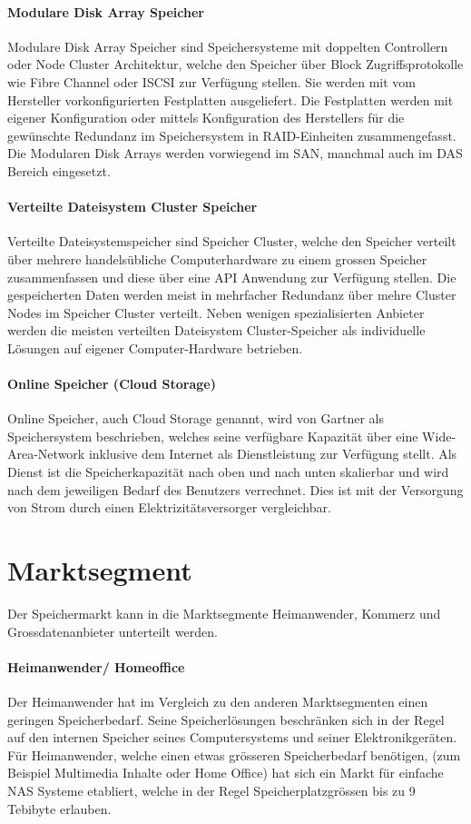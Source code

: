 \paragraph*{Modulare Disk Array Speicher}
Modulare Disk Array Speicher sind Speichersysteme mit doppelten Controllern oder Node Cluster Architektur, welche den Speicher über Block Zugriffsprotokolle wie Fibre Channel oder ISCSI zur Verfügung stellen. Sie werden mit vom Hersteller vorkonfigurierten Festplatten ausgeliefert. Die Festplatten werden mit eigener Konfiguration oder mittels Konfiguration des Herstellers für die gewünschte Redundanz im Speichersystem in RAID-Einheiten zusammengefasst. Die Modularen Disk Arrays werden vorwiegend im SAN, manchmal auch im DAS Bereich eingesetzt.

\paragraph*{Verteilte Dateisystem Cluster Speicher}
Verteilte Dateisystemspeicher sind Speicher Cluster, welche den Speicher verteilt über mehrere handelsübliche Computerhardware zu einem grossen Speicher zusammenfassen und diese über eine API Anwendung zur Verfügung stellen. Die gespeicherten Daten werden meist in mehrfacher Redundanz über mehre Cluster Nodes im Speicher Cluster verteilt. Neben wenigen spezialisierten Anbieter werden die meisten verteilten Dateisystem Cluster-Speicher als individuelle Lösungen auf eigener Computer-Hardware betrieben.

\paragraph*{Online Speicher (Cloud Storage)}
Online Speicher, auch Cloud Storage genannt, wird von Gartner als Speichersystem beschrieben, welches seine verfügbare Kapazität über eine Wide-Area-Network inklusive dem Internet als Dienstleistung zur Verfügung stellt. Als Dienst ist die Speicherkapazität nach oben und nach unten skalierbar und wird nach dem jeweiligen Bedarf des Benutzers verrechnet. Dies ist mit der Versorgung von Strom durch einen Elektrizitätsversorger vergleichbar. \cite{AdamW.Couture2010}

\section{Marktsegment}
Der Speichermarkt kann in die Marktsegmente Heimanwender, Kommerz und Grossdatenanbieter unterteilt werden.

\paragraph*{Heimanwender/ Homeoffice} 
Der Heimanwender hat im Vergleich zu den anderen Marktsegmenten einen geringen Speicherbedarf. Seine Speicherlösungen beschränken sich in der Regel auf den internen Speicher seines Computersystems und seiner Elektronikgeräten. Für Heimanwender, welche einen etwas grösseren Speicherbedarf benötigen, (zum Beispiel Multimedia Inhalte oder Home Office) hat sich ein Markt für einfache NAS Systeme etabliert, welche in der Regel Speicherplatzgrössen bis zu 9 Tebibyte erlauben.



